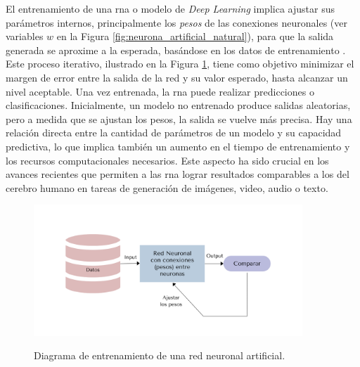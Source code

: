 El entrenamiento de una \gls{rna} o modelo de \emph{Deep Learning} implica ajustar sus parámetros internos, principalmente los \emph{pesos} de las conexiones neuronales (ver variables $w$ en la Figura \ref{fig:neurona_artificial_natural}), para que la salida generada se aproxime a la esperada, basándose en los datos de entrenamiento \citep{NurArtificialNeural2014}. Este proceso iterativo, ilustrado en la Figura \ref{fig:ann_training}, tiene como objetivo minimizar el margen de error entre la salida de la red y su valor esperado, hasta alcanzar un nivel aceptable. Una vez entrenada, la \gls{rna} puede realizar predicciones o clasificaciones. Inicialmente, un modelo no entrenado produce salidas aleatorias, pero a medida que se ajustan los pesos, la salida se vuelve más precisa. Hay una relación directa entre la cantidad de parámetros de un modelo y su capacidad predictiva, lo que implica también un aumento en el tiempo de entrenamiento y los recursos computacionales necesarios. Este aspecto ha sido crucial en los avances recientes que permiten a las \gls{rna} lograr resultados comparables a los del cerebro humano en tareas de generación de imágenes, video, audio o texto.

\begin{figure}[H]
    \caption[Diagrama de entrenamiento de una red neuronal artificial]{Diagrama de entrenamiento de una red neuronal artificial.}
    \centering
    \includegraphics[width=0.9\textwidth]{./figuras/ann_training.png}
    \source{\propio}
    \label{fig:ann_training}
\end{figure}

